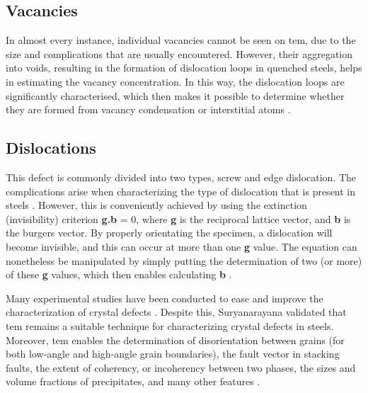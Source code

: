 \subsection{Vacancies} 
 In almost every instance, individual vacancies cannot be seen on \acrshort{tem}, due to the size and complications that are usually encountered. However, their aggregation into voids, resulting in the formation of dislocation loops in quenched steels, helps in estimating the vacancy concentration. In this way, the dislocation loops are significantly characterised, which then makes it possible to determine whether they are formed from vacancy condensation or interstitial atoms \cite{suryanarayana2017microstructure}.

\subsection{Dislocations}
This defect is commonly divided into two types, screw and edge dislocation. The complications arise when characterizing the type of dislocation that is present in steels \cite{jones2012engineering}. However, this is conveniently achieved by using the extinction (invisibility) criterion \textbf{g.b} = 0, where \textbf{g} is the reciprocal lattice vector, and \textbf{b} is the burgers vector. By properly orientating the specimen, a dislocation will become invisible, and this can occur at more than one \textbf{g} value. The equation can nonetheless be manipulated by simply putting the determination of two (or more) of these \textbf{g} values, which then enables calculating \textbf{b} \cite{suryanarayana2017microstructure}.

Many experimental studies have been conducted to ease and improve the characterization of crystal defects \cite{george2002introduction, bhadeshia2017steels, karayan2014weld}. Despite this, Suryanarayana \cite{suryanarayana2017microstructure} validated that \acrshort{tem} remains a suitable technique for characterizing crystal defects in steels. Moreover, \acrshort{tem} enables the determination of disorientation between grains (for both low-angle and high-angle grain boundaries), the fault vector in stacking faults, the extent of coherency, or incoherency between two phases, the sizes and volume fractions of precipitates, and many other features \cite{suryanarayana2017microstructure}.

